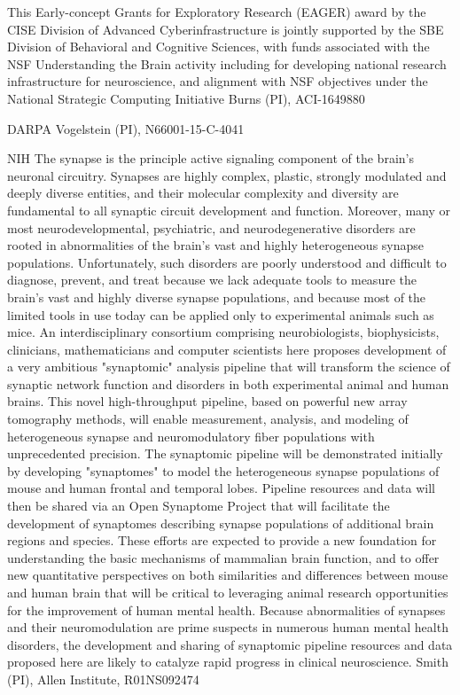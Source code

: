 \documentclass[10pt,colorlinks=true,urlcolor=blue]{moderncv}
\begin{document}
{%
This Early-concept Grants for Exploratory Research (EAGER) award by the
CISE Division of Advanced Cyberinfrastructure is jointly supported by
the SBE Division of Behavioral and Cognitive Sciences, with funds
associated with the NSF Understanding the Brain activity including for
developing national research infrastructure for neuroscience, and
alignment with NSF objectives under the National Strategic Computing
Initiative%
    }
    {Burns (PI), ACI-1649880}{}

    {DARPA}
    {}
    {Vogelstein (PI), N66001-15-C-4041}{}

    {NIH}
    {
    The synapse is the principle active signaling component of the brain's neuronal circuitry. Synapses are highly complex, plastic, strongly modulated and deeply diverse entities, and their molecular complexity and diversity are fundamental to all synaptic circuit development and function. Moreover, many or most neurodevelopmental, psychiatric, and neurodegenerative disorders are rooted in abnormalities of the brain's vast and highly heterogeneous synapse populations. Unfortunately, such disorders are poorly understood and difficult to diagnose, prevent, and treat because we lack adequate tools to measure the brain's vast and highly diverse synapse populations, and because most of the limited tools in use today can be applied only to experimental animals such as mice. An interdisciplinary consortium comprising neurobiologists, biophysicists, clinicians, mathematicians and computer scientists here proposes development of a very ambitious "synaptomic" analysis pipeline that will transform the science of synaptic network function and disorders in both experimental animal and human brains. This novel high-throughput pipeline, based on powerful new array tomography methods, will enable measurement, analysis, and modeling of heterogeneous synapse and neuromodulatory fiber populations with unprecedented precision. The synaptomic pipeline will be demonstrated initially by developing "synaptomes" to model the heterogeneous synapse populations of mouse and human frontal and temporal lobes. Pipeline resources and data will then be shared via an Open Synaptome Project that will facilitate the development of synaptomes describing synapse populations of additional brain regions and species. These efforts are expected to provide a new foundation for understanding the basic mechanisms of mammalian brain function, and to offer new quantitative perspectives on both similarities and differences between mouse and human brain that will be critical to leveraging animal research opportunities for the improvement of human mental health. Because abnormalities of synapses and their neuromodulation are prime suspects in numerous human mental health disorders, the development and sharing of synaptomic pipeline resources and data proposed here are likely to catalyze rapid progress in clinical neuroscience.
    }
    {Smith (PI), Allen Institute, R01NS092474}{}
\end{document}
